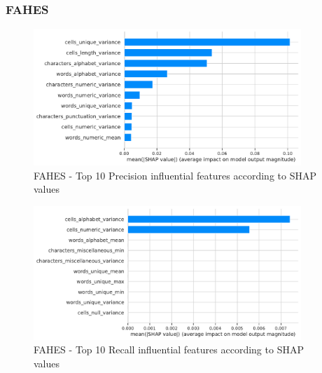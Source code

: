 \subsubsection{FAHES}
\begin{figure}[H]
    \centering
    \includegraphics[width=0.9\textwidth]{thesis/Figures/RQ4/Shap_cell_prec_FAHES.pdf}
    \caption{FAHES - Top 10 Precision influential features according to SHAP values}
    \label{fig:feature_importance_prec_FAHES}
\end{figure}
\begin{figure}[H]
    \centering
    \includegraphics[width=0.9\textwidth]{thesis/Figures/RQ4/Shap_cell_rec_FAHES.pdf}
    \caption{FAHES - Top 10 Recall influential features according to SHAP values}
    \label{fig:feature_importance_rec_FAHES}
\end{figure}


